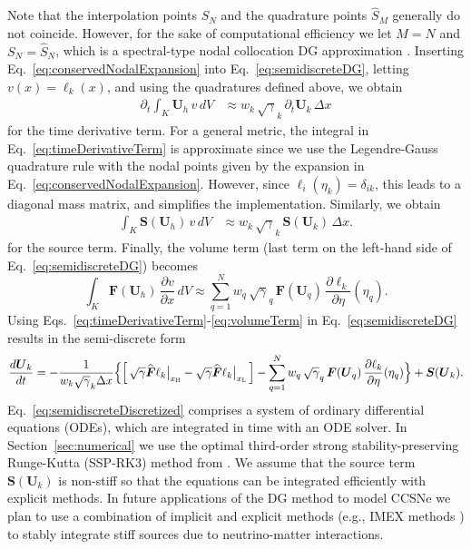 \documentclass[letterpaper]{jpconf}
\newcommand{\deriv}[2]{\frac{d #1}{d #2}}
\newcommand{\pderiv}[2]{\frac{\partial #1}{\partial #2}}
\newcommand{\vect}[1]{\boldsymbol{#1}}
\newcommand{\f}[2]{\frac{#1}{#2}}
\newcommand{\dx}{\Delta x}
\newcommand{\pd}[2]{\partial_{#2}{#1}}
\newcommand{\xL}{x_{\textnormal{\tiny\textsc{L}}}}
\newcommand{\xH}{x_{\textnormal{\tiny\textsc{H}}}}
\begin{document}
Note that the interpolation points $S_{N}$ and the quadrature points $\hat{S}_{M}$ generally do not coincide.  
However, for the sake of computational efficiency we let $M=N$ and $S_{N}=\hat{S}_{N}$, which is a spectral-type nodal collocation DG approximation \cite{bassi_etal_2013}.  
Inserting Eq.~\eqref{eq:conservedNodalExpansion} into Eq.~\eqref{eq:semidiscreteDG}, letting $v(x)=\ell_{k}(x)$, and using the quadratures defined above, we obtain
\begin{align}
  \pd{}{t}\int_{K}\vect{U}_{h}\,v\,dV
  &\approx w_{k}\,\sqrt{\gamma}_{k}\,\pd{}{t}\vect{U}_{k}\,\dx
  \label{eq:timeDerivativeTerm}
\end{align}
for the time derivative term.  
For a general metric, the integral in Eq.~\eqref{eq:timeDerivativeTerm} is approximate since we use the Legendre-Gauss quadrature rule with the nodal points given by the expansion in Eq.~\eqref{eq:conservedNodalExpansion}.  
However, since $\ell_{i}(\eta_{k})=\delta_{ik}$, this leads to a diagonal mass matrix, and simplifies the implementation.  
Similarly, we obtain
\begin{align}
  \int_{K}\vect{S}(\vect{U}_{h})\,v\,dV
  &\approx w_{k}\,\sqrt{\gamma}_{k}\,\vect{S}(\vect{U}_{k})\,\dx.
  \label{eq:sourceTerm}
\end{align}
for the source term.  
Finally, the volume term (last term on the left-hand side of Eq.~\eqref{eq:semidiscreteDG}) becomes
\begin{equation}
  \int_{K}\vect{F}(\vect{U}_{h})\,\pderiv{v}{x}\,dV
  \approx \sum_{q=1}^{N}w_{q}\,\sqrt{\gamma}_{q}\,\vect{F}(\vect{U}_{q})\,\pderiv{\ell_{k}}{\eta}(\eta_{q}).
  \label{eq:volumeTerm}
\end{equation}
Using Eqs.~\eqref{eq:timeDerivativeTerm}-\eqref{eq:volumeTerm} in Eq.~\eqref{eq:semidiscreteDG} results in the semi-discrete form
\begin{align}
  \deriv{\vect{U}_{k}}{t}
  =-\f{1}{w_{k}\sqrt{\gamma}_{k}\dx}
  \Big\{
  \Big[\,
    \sqrt{\gamma}\widehat{\vect{F}}\ell_{k}\big|_{\xH}
    -\sqrt{\gamma}\widehat{\vect{F}}\ell_{k}\big|_{\xL}
  \,\Big]
  -\sum_{q=1}^{N}w_{q}\,\sqrt{\gamma}_{q}\,\vect{F}(\vect{U}_{q})\,\pderiv{\ell_{k}}{\eta}(\eta_{q})
  \Big\} + \vect{S}(\vect{U}_{k}).
  \label{eq:semidiscreteDiscretized}
\end{align}
Eq.~\eqref{eq:semidiscreteDiscretized} comprises a system of ordinary differential equations (ODEs), which are integrated in time with an ODE solver.  
In Section~\ref{sec:numerical} we use the optimal third-order strong stability-preserving Runge-Kutta (SSP-RK3) method from \cite{shuOsher_1988}.  
We assume that the source term $\vect{S}(\vect{U}_{k})$ is non-stiff so that the equations can be integrated efficiently with explicit methods.  
In future applications of the DG method to model CCSNe we plan to use a combination of implicit and explicit methods (e.g., IMEX methods \cite{ascher_etal_1997}) to stably integrate stiff sources due to neutrino-matter interactions.  
\end{document}
